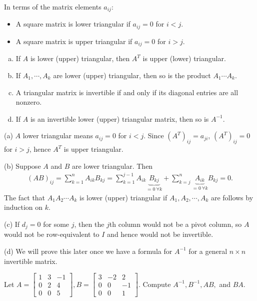 \documentclass[12pt,letterpaper,reqno]{article}
\numberwithin{equation}{section}
\begin{document}
In terms of the matrix elements $a_{ij}$: 
\begin{itemize}
	\item A square matrix is lower triangular if $a_{ij}=0$ for $i<j$.
	\item A square matrix is upper triangular if $a_{ij}=0$ for $i>j$.
\end{itemize}

\begin{thm} \label{thm:properties_of_triangular_matrices} \hspace{10cm}
		\begin{enumerate}[(a)]
	\item If $A$ is lower (upper) triangular, then $A^T$ is upper (lower) triangular.
	\item If $A_1,\cdots, A_k$ are lower (upper) triangular, then so is the product $A_1\cdots A_k$.
	\item A triangular matrix is invertible if and only if its diagonal entries are all nonzero.
	\item If $A$ is an invertible lower (upper) triangular matrix, then so is $A^{-1}$.
	\end{enumerate}
\end{thm}

\begin{pf}
(a) $A$ lower triangular means $a_{ij}=0$ for $i<j$. Since $(A^T)_{ij}=a_{ji}$, $(A^T)_{ij}=0$ for $i>j$, hence $A^T$ is upper triangular. 

(b) Suppose $A$ and $B$ are lower triangular. Then 
\begin{align*}
	(AB)_{ij}=\sum_{k=1}^{n}A_{ik}B_{kj}=\sum_{k=1}^{j-1}A_{ik}\underbrace{B_{kj}}_{=0 \ \forall k}+\sum_{k=j}^{n}\underbrace{A_{ik}}_{=0 \ \forall k}B_{kj}=0.
\end{align*}
The fact that $A_1 A_2 \cdots A_k$ is lower (upper) triangular if $A_1, A_2,\cdots, A_k$ are follows by induction on $k$. 

(c) If $d_j=0$ for some $j$, then the $j$th column would not be a pivot column, so $A$ would not be row-equivalent to $I$ and hence would not be invertible. 

(d) We will prove this later once we have a formula for $A^{-1}$ for a general $n \times n$ invertible matrix.	
\end{pf}

\begin{exercise}
Let $A=\begin{bmatrix}
		1 & 3 & -1 \\ 0 & 2 & 4 \\ 0 & 0 & 5
	\end{bmatrix}, B= \begin{bmatrix}
		3 & -2 & 2 \\ 0 & 0 & -1 \\ 0 & 0 & 1
	\end{bmatrix}$. Compute $A^{-1}, B^{-1}, AB,$ and $BA$.	
\end{exercise}
\end{document}
